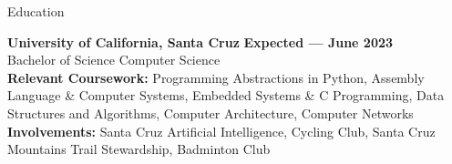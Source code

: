 \documentclass{resume}
\begin{document}
\begin{rSection}{\large Education}

{\bf University of California, Santa Cruz} \hfill {\bf{Expected --- June 2023}}
\\ Bachelor of Science Computer Science\hfill %
\\ \textbf{Relevant Coursework:} Programming Abstractions in Python, Assembly Language \& Computer Systems, Embedded Systems \& C Programming, Data Structures and Algorithms, Computer Architecture, Computer Networks
\\ \textbf{Involvements:}  Santa Cruz Artificial Intelligence, Cycling Club, Santa Cruz Mountains Trail Stewardship, Badminton Club

\end{rSection}
\end{document}
